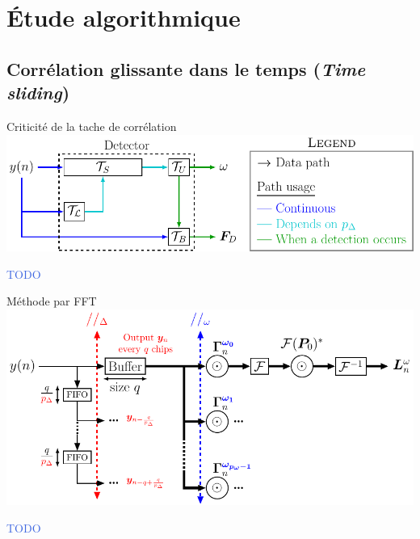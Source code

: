 \documentclass[../main.tex]{subfiles}
\begin{document}
\section{Étude algorithmique}





\subsection{Corrélation glissante dans le temps (\emph{Time sliding})}

\begin{frame}{Criticité de la tache de corrélation}
  \includegraphics[width=\linewidth]{figures/tikzpicture/tasks_dep_stdl.pdf}
  \begin{center}
    \textcolor{RoyalBlue}{TODO}
  \end{center}
\end{frame}

\begin{frame}{Méthode par FFT}
  \includegraphics[width=\linewidth]{figures/tikzpicture/corr_method_fft_stdl.pdf}
  \begin{center}
    \textcolor{RoyalBlue}{TODO}
  \end{center}
\end{frame}
\end{document}
